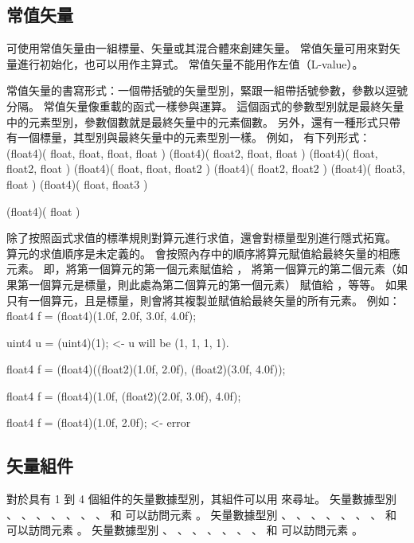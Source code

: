 \subsection{常值矢量}

可使用常值矢量由一組標量、矢量或其混合體來創建矢量。
常值矢量可用來對矢量進行初始化，也可以用作主算式。
常值矢量不能用作左值（L-value）。

常值矢量的書寫形式：一個帶括號的矢量型別，緊跟一組帶括號參數，參數以逗號分隔。
常值矢量像重載的函式一樣參與運算。
這個函式的參數型別就是最終矢量中的元素型別，參數個數就是最終矢量中的元素個數。
另外，還有一種形式只帶有一個標量，其型別與最終矢量中的元素型別一樣。
例如，  有下列形式：
\startclc
(float4)( float, float, float, float )
(float4)( float2, float, float )
(float4)( float, float2, float )
(float4)( float, float, float2 )
(float4)( float2, float2 )
(float4)( float3, float )
(float4)( float, float3 )

(float4)( float )
\stopclc

除了按照函式求值的標準規則對算元進行求值，還會對標量型別進行隱式拓寬。
算元的求值順序是未定義的。
會按照內存中的順序將算元賦值給最終矢量的相應元素。
即，將第一個算元的第一個元素賦值給 ，
將第一個算元的第二個元素（如果第一個算元是標量，則此處為第二個算元的第一個元素）
賦值給 ，等等。
如果只有一個算元，且是標量，則會將其複製並賦值給最終矢量的所有元素。
例如：
\startclc
float4	f = (float4)(1.0f, 2.0f, 3.0f, 4.0f);

uint4	u = (uint4)(1);		<- u will be (1, 1, 1, 1).

float4	f = (float4)((float2)(1.0f, 2.0f),
		     (float2)(3.0f, 4.0f));

float4	f = (float4)(1.0f, (float2)(2.0f, 3.0f), 4.0f);

float4	f = (float4)(1.0f, 2.0f);	<- error
\stopclc

\subsection{矢量組件}

對於具有 1 到 4 個組件的矢量數據型別，其組件可以用  來尋址。
矢量數據型別 、 、 、 、
 、 、 、  和 
 可以訪問元素 。
矢量數據型別 、 、 、 、
 、 、 、  和 
 可以訪問元素 。
矢量數據型別 、 、 、 、
 、 、 、  和 
 可以訪問元素 。

